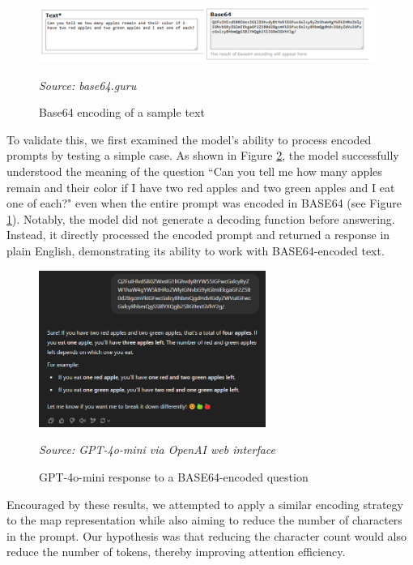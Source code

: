 \vspace{5mm}
\begin{figure}[ht!]
  \centering
  \includegraphics[width=0.98\textwidth]{images/data_collection/texttob64.png}
  \caption{Base64 encoding of a sample text}
  {\emph{Source: base64.guru}\footnotemark} \label{fig:texttob64}
\end{figure}
\vspace{5mm}

To validate this, we first examined the model's ability to process encoded
prompts by testing a simple case. As shown in Figure \ref{fig:b64gpt}, the model
successfully understood the meaning of the question ``Can you tell me how many
apples remain and their color if I have two red apples and two green apples and
I eat one of each?" even when the entire prompt was encoded in BASE64 (see Figure
\ref{fig:texttob64}). Notably, the model did not generate a decoding function
before answering. Instead, it directly processed the encoded prompt and returned
a response in plain English, demonstrating its ability to work with BASE64-encoded
text.

\begin{figure}[ht!]
  \centering
  \includegraphics[width=0.66\textwidth]{images/data_collection/b64gpt.png}
  \caption{GPT-4o-mini response to a BASE64-encoded question}
  {\emph{Source: GPT-4o-mini via OpenAI web interface}} \label{fig:b64gpt}
\end{figure}

Encouraged by these results, we attempted to apply a similar encoding strategy to
the map representation while also aiming to reduce the number of characters in the
prompt. Our hypothesis was that reducing the character count would also reduce
the number of tokens, thereby improving attention efficiency.

